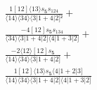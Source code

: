 \documentclass[varwidth, border=5pt]{standalone}
\begin{document}
\begin{my}
$\begin{gathered}
\scriptscriptstyle\frac{1[12]⟨13⟩s_{𝟓}s_{124}}{⟨14⟩⟨34⟩⟨3|1+4|2]²} +\\
\scriptscriptstyle\frac{-4[12]s_{𝟓}s_{134}}{⟨34⟩⟨3|1+4|2]⟨4|1+3|2]} +\\
\scriptscriptstyle\frac{-2⟨12⟩[12]s_{𝟓}}{⟨14⟩⟨34⟩⟨3|1+4|2]} +\\
\scriptscriptstyle\frac{1[12]⟨13⟩s_{𝟓}⟨4|1+2|3]}{⟨14⟩⟨34⟩⟨3|1+4|2]⟨4|1+3|2]} \phantom{+}
\end{gathered}$
\end{my}
\end{document}
